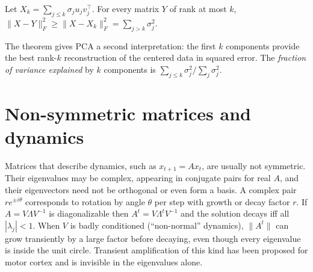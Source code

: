 \begin{theorem}
Let $X_k=\sum_{j\le k}\sigma_ju_jv_j^\top$. For every matrix $Y$ of rank at most $k$, $\|X-Y\|_F^2\ge\|X-X_k\|_F^2=\sum_{j>k}\sigma_j^2$.
\end{theorem}
The theorem gives PCA a second interpretation: the first $k$ components provide the best rank-$k$ reconstruction of the centered data in squared error. The \emph{fraction of variance explained} by $k$ components is $\sum_{j\le k}\sigma_j^2/\sum_j\sigma_j^2$.

\section{Non-symmetric matrices and dynamics}
Matrices that describe dynamics, such as $x_{t+1}=Ax_t$, are usually not symmetric. Their eigenvalues may be complex, appearing in conjugate pairs for real $A$, and their eigenvectors need not be orthogonal or even form a basis. A complex pair $re^{\pm i\theta}$ corresponds to rotation by angle $\theta$ per step with growth or decay factor $r$. If $A=V\Lambda V^{-1}$ is diagonalizable then $A^t=V\Lambda^tV^{-1}$ and the solution decays iff all $|\lambda_j|<1$. When $V$ is badly conditioned (``non-normal'' dynamics), $\|A^t\|$ can grow transiently by a large factor before decaying, even though every eigenvalue is inside the unit circle. Transient amplification of this kind has been proposed for motor cortex and is invisible in the eigenvalues alone.

